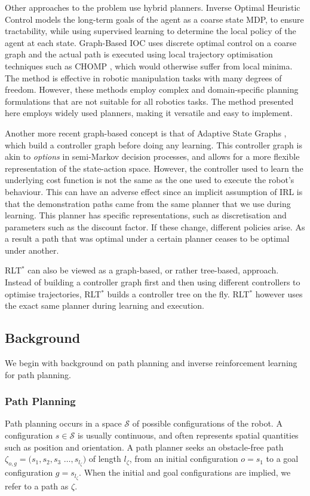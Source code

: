 \documentclass[a4paper,11pt]{report}
\begin{document}
Other approaches to the problem use hybrid planners. Inverse Optimal Heuristic Control \cite{ratliff2009inverse} models the long-term goals of the agent as a coarse state MDP, to ensure tractability, while using supervised learning to determine the local policy of the agent at each state. Graph-Based IOC \cite{byravan2015graph} uses discrete optimal control on a coarse graph and the actual path is executed using local trajectory optimisation techniques such as CHOMP \cite{ratliff2009chomp}, which would otherwise suffer from local minima. The method is effective in robotic manipulation tasks with many degrees of freedom.  However, these methods employ complex and domain-specific planning formulations that are not suitable for all robotics tasks. The method presented here employs widely used planners, making it versatile and easy to implement. 

Another more recent graph-based concept is that of Adaptive State Graphs \cite{okallearning}, which build a controller graph before doing any learning. This controller graph is akin to \emph{options} in semi-Markov decision processes, and allows for a more flexible representation of the state-action space. However, the controller used to learn the underlying cost function is not the same as the one used to execute the robot's behaviour. This can have an adverse effect since an implicit assumption of IRL is that the demonstration paths came from the same planner that we use during learning. This planner has specific representations, such as discretisation and parameters such as the discount factor. If these change, different policies arise. As a result a path that was optimal under a certain planner ceases to be optimal under another.

RLT$^*$ can also be viewed as a graph-based, or rather tree-based, approach. Instead of building a controller graph first and then using different controllers to optimise trajectories, RLT$^*$ builds a controller tree on the fly. RLT$^*$ however uses the exact same planner during learning and execution.


\subsection{Background}
We begin with background on path planning and inverse reinforcement learning for path planning.

\subsubsection{Path Planning \label{subsec:path_planning}}
Path planning occurs in a space $\mathcal{S}$ of possible configurations of the robot. A configuration $s \in \mathcal{S}$ is usually continuous, and often represents spatial quantities such as position and orientation. A path planner seeks an obstacle-free path $\zeta_{o,g} = (s_1,s_2,s_3$ $\ldots,s_{l_{\zeta}}) $ of length $l_{\zeta}$, from an initial configuration $o = s_1$ to a goal configuration  $g =s_{l_{\zeta}}$. When the initial and goal configurations are implied, we refer to a path as $\zeta$.
\end{document}

